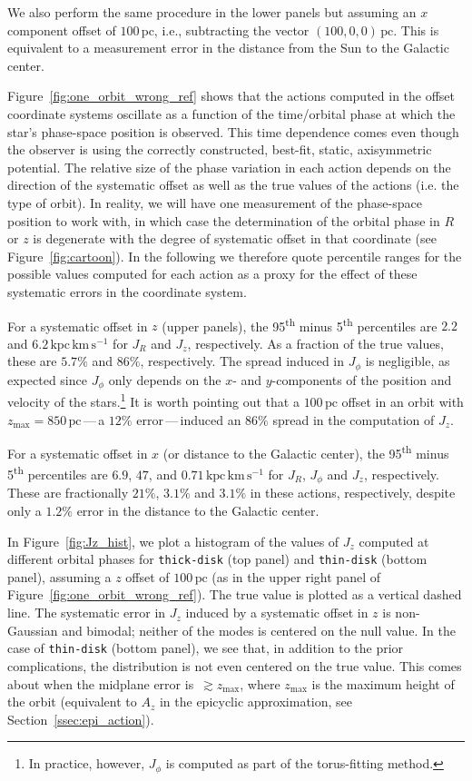 \documentclass[twocolumn]{aastex62}
\newcommand{\pc}{\text{pc}}
\newcommand{\kms}{\text{km}\,\text{s}^{-1}}
\newcommand{\actunit}{\text{kpc}\,\kms}
\newcommand{\thin}{\texttt{thin-disk}}
\newcommand{\thick}{\texttt{thick-disk}}
\begin{document}
We also perform the same procedure in the lower panels but assuming an $x$
component offset of $100\,\pc$, i.e., subtracting the vector $(100, 0,
0)\,\pc$. This is equivalent to a measurement error in the distance from the
Sun to the Galactic center.

Figure~\ref{fig:one_orbit_wrong_ref} shows that the actions computed in the
offset coordinate systems oscillate as a function of the time/orbital phase at
which the star's phase-space position is observed. This time dependence comes
even though the observer is using the correctly constructed, best-fit, static,
axisymmetric potential. The relative size of the phase variation in each
action depends on the direction of the systematic offset as well as the true
values of the actions (i.e. the type of orbit). In reality, we will have one
measurement of the phase-space position to work with, in which case the
determination of the orbital phase in $R$ or $z$ is degenerate with the degree
of systematic offset in that coordinate (see Figure~\ref{fig:cartoon}). In the
following we therefore quote percentile ranges for the possible values
computed for each action as a proxy for the effect of these systematic errors
in the coordinate system.

For a systematic offset in $z$ (upper panels), the 95\textsuperscript{th}
minus 5\textsuperscript{th} percentiles are $2.2$ and $6.2\,\actunit$ for
$J_R$ and $J_z$, respectively. As a fraction of the true values, these are
$5.7\%$ and $86\%$, respectively. The spread induced in $J_{\phi}$ is
negligible, as expected since $J_{\phi}$ only depends on the $x$- and
$y$-components of the position and velocity of the stars.\footnote{In
practice, however, $J_{\phi}$ is computed as part of the torus-fitting
method.} It is worth pointing out that a $100\,\pc$ offset in an orbit with
$z_{\text{max}}=850\,\pc$\,---\,a $12\%$ error\,---\,induced an $86\%$ spread
in the computation of $J_z$.

For a systematic offset in $x$ (or distance to the Galactic center), the
95\textsuperscript{th} minus 5\textsuperscript{th} percentiles are $6.9$,
$47$, and $0.71\,\actunit$ for $J_R$, $J_{\phi}$ and $J_z$, respectively.
These are fractionally $21\%$, $3.1\%$ and $3.1\%$ in these actions,
respectively, despite only a $1.2\%$ error in the distance to the Galactic
center.

In Figure~\ref{fig:Jz_hist}, we plot a histogram of the values of $J_z$
computed at different orbital phases for \thick{} (top panel) and \thin{}
(bottom panel), assuming a $z$ offset of $100\,\pc$ (as in the upper right
panel of Figure~\ref{fig:one_orbit_wrong_ref}). The true value is plotted as a
vertical dashed line. The systematic error in $J_z$ induced by a systematic
offset in $z$ is non-Gaussian and bimodal; neither of the modes is centered on
the null value. In the case of \thin{} (bottom panel), we see that, in
addition to the prior complications, the distribution is not even centered on
the true value. This comes about when the midplane error is~$\gtrsim
z_{\text{max}}$, where $z_{\text{max}}$ is the maximum height of the orbit
(equivalent to $A_z$ in the epicyclic approximation, see
Section~\ref{ssec:epi_action}).
\end{document}
